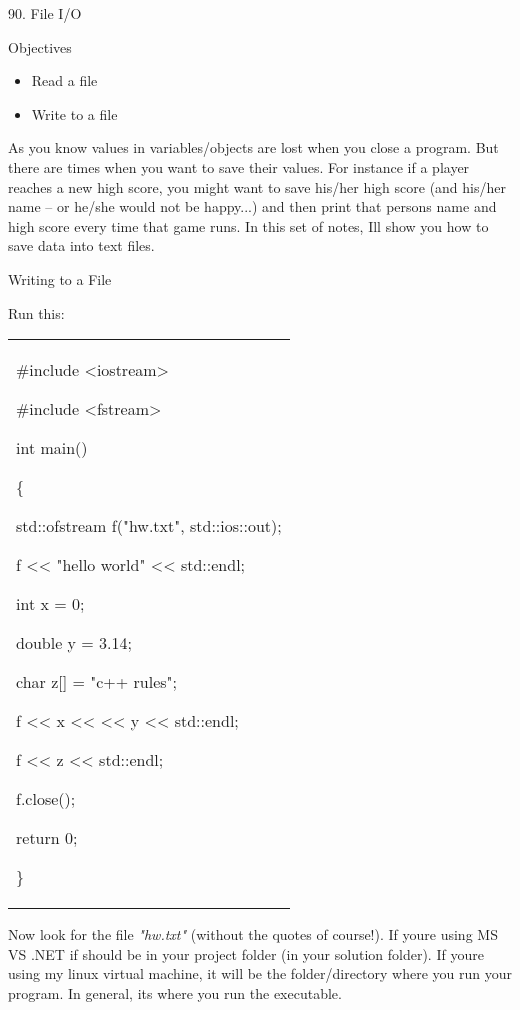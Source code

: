 \documentclass[
]{article}
\author{}
\date{}
\providecommand{\tightlist}{%
  \setlength{\itemsep}{0pt}\setlength{\parskip}{0pt}}
\begin{document}
90. File I/O

Objectives

\begin{itemize}
\tightlist
\item
  Read a file
\item
  Write to a file
\end{itemize}

As you know values in variables/objects are lost when you close a
program. But there are times when you want to save their values. For
instance if a player reaches a new high score, you might want to save
his/her high score (and his/her name -- or he/she would not be happy...)
and then print that person\textquotesingle s name and high score every
time that game runs. In this set of notes, I\textquotesingle ll show you
how to save data into text files.

Writing to a File

\begin{quote}
\end{quote}

Run this:

\begin{longtable}[]{@{}
  >{\raggedright\arraybackslash}p{}@{}}
\toprule\noalign{}
 \\
\midrule\noalign{}
\endhead
\bottomrule\noalign{}
\endlastfoot
\#include \textless iostream\textgreater{}

\#include \textless fstream\textgreater{}

int main()

\{

std::ofstream f("hw.txt", std::ios::out);

f \textless\textless{} "hello world" \textless\textless{} std::endl;

int x = 0;

double y = 3.14;

char z{[}{]} = "c++ rules";

f \textless\textless{} x \textless\textless{} \textquotesingle{}
\textquotesingle{} \textless\textless{} y \textless\textless{}
std::endl;

f \textless\textless{} z \textless\textless{} std::endl;

f.close();

return 0;

\} \\
\end{longtable}

Now look for the file \emph{"hw.txt"} (without the quotes of course!).
If you\textquotesingle re using MS VS .NET if should be in your project
folder (in your solution folder). If you\textquotesingle re using my
linux virtual machine, it will be the folder/directory where you run
your program. In general, it\textquotesingle s where you run the
executable.
\end{document}
